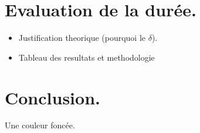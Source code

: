 \documentclass{article}
\begin{document}
\section{Evaluation de la durée.}
\begin{itemize}
\item Justification theorique (pourquoi le $\delta$).
\item Tableau des resultats et methodologie
\end{itemize}

\section{Conclusion.}



Une couleur foncée.
\end{document}
